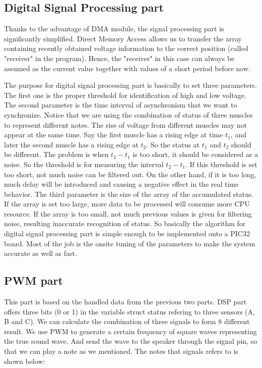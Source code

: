 \documentclass[12pt]{article}
\begin{document}
\subsection{Digital Signal Processing part}
Thanks to the advantage of DMA module, the signal processing part is significantly simplified. Direct Memory Access allows us to transfer the array containing recently obtained voltage information to the correct position (called "receiver" in the program). Hence, the "receiver" in this case can always be assumed as the current value together with values of a short period before now. 

The purpose for digital signal processing part is basically to set three parameters. The first one is the proper threshold for identification of high and low voltage. The second parameter is the time interval of asynchronism that we want to synchronize. Notice that we are using the combination of status of three muscles to represent different notes. The rise of voltage from different muscles may not appear at the same time. Say the first muscle has a rising edge at time $t_1$, and later the second muscle has a rising edge at $t_2$. So the status at $t_1$ and $t_2$ should be different. The problem is when $t_2-t_1$ is too short, it should be considered as a noise. So the threshold is for measuring the interval $t_2-t_1$. If this threshold is set too short, not much noise can be filtered out. On the other hand, if it is too long, much delay will be introduced and causing a negative effect in the real time behavior. The third parameter is the size of the array of the accumulated status. If the array is set too large, more data to be processed will consume more CPU resource. If the array is too small, not much previous values is given for filtering noise, resulting inaccurate recognition of status. So basically the algorithm for digital signal processing part is simple enough to be implemented onto a PIC32 board. Most of the job is the onsite tuning of the parameters to make the system accurate as well as fast.

\subsection{PWM part}

This part is based on the handled data from the previous two parts. DSP part offers three bits (0 or 1) in the variable struct status refering to three sensors (A, B and C). We can calculate the combination of three signals to form 8 different result. We use PWM to generate a certain frequency of square waves representing the true sound wave. And send the wave to the speaker through the signal pin, so that we can play a note as we mentioned. The notes that signals refers to is shown below:
\end{document}
